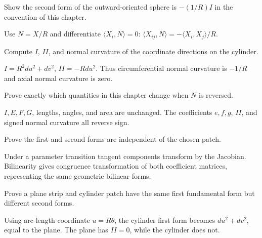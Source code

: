 \begin{problem}[Sphere]\label{prob:vii15-05}
Show the second form of the outward-oriented sphere is \(-(1/R)I\) in the convention of this chapter.
\end{problem}
\begin{solution}
Use \(N=X/R\) and differentiate \(\langle X_i,N\rangle=0\): \(\langle X_{ij},N\rangle=-\langle X_i,X_j\rangle/R\).
\end{solution}

\begin{problem}[Cylinder]\label{prob:vii15-06}
Compute \(I\), \(II\), and normal curvature of the coordinate directions on the cylinder.
\end{problem}
\begin{solution}
\(I=R^2du^2+dv^2\), \(II=-Rdu^2\). Thus circumferential normal curvature is \(-1/R\) and axial normal curvature is zero.
\end{solution}

\begin{problem}\label{prob:vii15-07}
Prove exactly which quantities in this chapter change when \(N\) is reversed.
\end{problem}
\begin{solution}
\(I,E,F,G\), lengths, angles, and area are unchanged. The coefficients \(e,f,g\), \(II\), and signed normal curvature all reverse sign.
\end{solution}

\begin{problem}\label{prob:vii15-08}
Prove the first and second forms are independent of the chosen patch.
\end{problem}
\begin{solution}
Under a parameter transition tangent components transform by the Jacobian. Bilinearity gives congruence transformation of both coefficient matrices, representing the same geometric bilinear forms.
\end{solution}

\begin{problem}\label{prob:vii15-09}
Prove a plane strip and cylinder patch have the same first fundamental form but different second forms.
\end{problem}
\begin{solution}
Using arc-length coordinate \(u=R\theta\), the cylinder first form becomes \(du^2+dv^2\), equal to the plane. The plane has \(II=0\), while the cylinder does not.
\end{solution}

